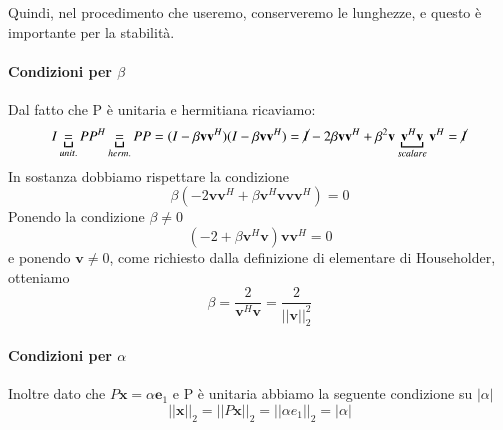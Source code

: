 Quindi, nel procedimento che useremo, conserveremo le lunghezze, e questo
\`e importante per la stabilit\`a.\\

\paragraph{Condizioni per $\beta$}
Dal fatto che P \`e unitaria e hermitiana ricaviamo:
$$ I \underbracket{=}_{unit.} PP^{H} \underbracket{=}_{herm.} PP = 
(I - \beta \mathbf{v}\mathbf{v}^{H})(I - \beta \mathbf{v}\mathbf{v}^{H}) = 
\cancel{I} - 2\beta \mathbf{v}\mathbf{v}^{H} + \beta^{2} \mathbf{v} \underbracket{\mathbf{v}^{H}\mathbf{v}}_{scalare}\mathbf{v}^{H} = 
\cancel{I} $$
In sostanza dobbiamo rispettare la condizione 
$$ \beta(-2\mathbf{v}\mathbf{v}^{H} + \beta \mathbf{v}^{H}\mathbf{v} \mathbf{v}\mathbf{v}^{H}) = 0 $$
Ponendo la condizione $\beta \neq 0$
   $$( -2 + \beta \mathbf{v}^{H}\mathbf{v}) \mathbf{v}\mathbf{v}^{H} = 0$$ 
e  ponendo $\mathbf{v} \neq 0$, come richiesto dalla
   definizione di elementare di Householder, otteniamo
  $$ \beta = \frac{2}{\mathbf{v}^{H}\mathbf{v}} = 
  \frac{2}{||\mathbf{v}||^{2}_{2}}
    $$

\paragraph{Condizioni per $\alpha$}
Inoltre dato che $P\mathbf{x} = \alpha \mathbf{e}_1$ e P \`e unitaria abbiamo la seguente condizione su $|\alpha|$
$$ ||\mathbf{x}||_2 = ||P\mathbf{x}||_2 = || \alpha e_{1}||_2 = |\alpha| $$

